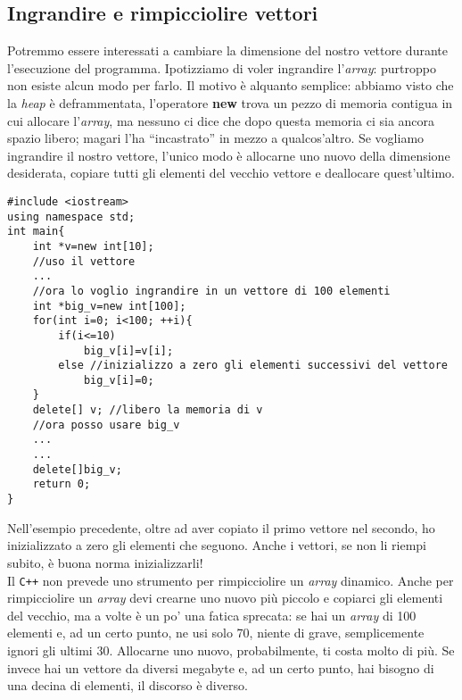 \subsection{Ingrandire e rimpicciolire vettori}\label{ingrimp}
Potremmo essere interessati a cambiare la dimensione del nostro vettore durante l'esecuzione del programma. Ipotizziamo di voler ingrandire l'\emph{array}: purtroppo non esiste alcun modo per farlo. Il motivo è alquanto semplice: abbiamo visto che la \emph{heap} è deframmentata, l'operatore \textbf{new} trova un pezzo di memoria contigua in cui allocare l'\emph{array}, ma nessuno ci dice che dopo questa memoria ci sia ancora spazio libero; magari l'ha ``incastrato'' in mezzo a qualcos'altro. Se vogliamo ingrandire il nostro vettore, l'unico modo è allocarne uno nuovo della dimensione desiderata, copiare tutti gli elementi del vecchio vettore e deallocare quest'ultimo. 
\begin{lstlisting}
#include <iostream>
using namespace std;
int main{
	int *v=new int[10];
	//uso il vettore
	...
	//ora lo voglio ingrandire in un vettore di 100 elementi
	int *big_v=new int[100];
	for(int i=0; i<100; ++i){
		if(i<=10)
			big_v[i]=v[i];
		else //inizializzo a zero gli elementi successivi del vettore
			big_v[i]=0;
	}
	delete[] v; //libero la memoria di v
	//ora posso usare big_v
	...
	...
	delete[]big_v;
	return 0;
}
\end{lstlisting}

Nell'esempio precedente, oltre ad aver copiato il primo vettore nel secondo, ho inizializzato a zero gli elementi che seguono. Anche i vettori, se non li riempi subito, è buona norma inizializzarli! \\

Il \verb|C++| non prevede uno strumento per rimpicciolire un \emph{array} dinamico.  Anche per rimpicciolire un \emph{array} devi crearne uno nuovo più piccolo e copiarci gli elementi del vecchio, ma a volte è un po' una fatica sprecata: se hai un \emph{array} di 100 elementi e, ad un certo punto, ne usi solo 70, niente di grave, semplicemente ignori gli ultimi 30. Allocarne uno nuovo, probabilmente, ti costa molto di più. Se invece hai un vettore da diversi megabyte e, ad un certo punto, hai bisogno di una decina di elementi, il discorso è diverso.

